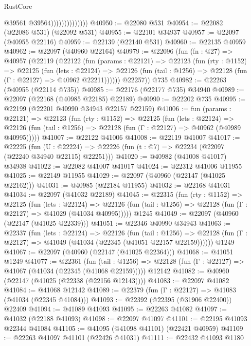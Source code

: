 \begin{lexlean}{RustCore}
\begin{coremodule}
                                @39561
                                @39564))))))))))))))
@40950 := @22080 @531
@40954 := @22082 (@22086 @531) (@22092 @531)
@40955 := @22101 @34937
@40957 := @22097 (@40955 @22116)
@40959 := @22139 (@22140 @531)
@40960 := @22135 @40959
@40962 := @22097 (@40960 @22164)
@40979 := @22096
    (fun (fn : @27) =>
    @40957
      (@22119
        (@22122
          (fun (params : @22121) =>
          @22123
            (fun (rty : @1152) =>
            @22125
              (fun (lets : @22124) =>
              @22126 (fun (tail : @1256) => @22128 (fun (Γ : @22127) => @40962 @22211))))))
        @22257))
    @735
@40982 := @22263 (@40955 (@22114 @735))
@40985 := @22176 (@22177 @735) @34940
@40989 := @22097 (@22168 (@40985 @22185) @22189)
@40990 := @22202 @735
@40995 := @22199 (@22201 @40990 @34943 @22157 @22159)
@41006 := fun (params : @22121) =>
  @22123
    (fun (rty : @1152) =>
    @22125
      (fun (lets : @22124) =>
      @22126 (fun (tail : @1256) => @22128 (fun (Γ : @22127) => @40962 (@40989 @40995)))))
@41007 := @22122 @41006
@41008 := @22119 @41007
@41017 := @22225
    (fun (U : @22224) => @22226 (fun (t : @7) => @22234 (@22097 (@22240 @34940 @22115) @22251)))
@41020 := @40982 (@41008 @41017) @34938
@41022 := @22082 @41007 @41017
@41024 := @22312 @41006 @11955
@41025 := @22149 @11955
@41029 := @22097 (@40960 (@22147 (@41025 @22162)))
@41031 := @40985 (@22184 @11955)
@41032 := @22168 @41031
@41034 := @22097 (@41032 @22189)
@41045 := @22315
    (fun (rty : @1152) =>
    @22125
      (fun (lets : @22124) =>
      @22126 (fun (tail : @1256) => @22128 (fun (Γ : @22127) => @41029 (@41034 @40995)))))
    @1245
@41049 := @22097 (@40960 (@22147 (@41025 @22339)))
@41051 := @22346 @40990 @34943
@41063 := @22337
    (fun (lets : @22124) =>
    @22126
      (fun (tail : @1256) =>
      @22128 (fun (Γ : @22127) => @41049 (@41034 (@22345 (@41051 @22157 @22159))))))
    @1249
@41067 := @22097 (@40960 (@22147 (@41025 @22364)))
@41068 := @41051 @1249
@41077 := @22361
    (fun (tail : @1256) => @22128 (fun (Γ : @22127) => @41067 (@41034 (@22345 (@41068 @22159)))))
    @12142
@41082 := @40960 (@22147 (@41025 (@22338 (@22156 @12143))))
@41083 := @22097 @41082
@41084 := @41068 @12142
@41089 := @22379 (fun (Γ : @22127) => @41083 (@41034 (@22345 @41084)))
@41093 := @22392 (@22395 (@31906 @22400)) @22409
@41094 := @41089 @41093
@41095 := @22263 @41082
@41097 := @41032 (@22188 @41093)
@41098 := @22097 @41097
@41101 := @22195 @41093 @22344 @41084
@41105 := @41095 (@41098 @41101) (@22421 @40959)
@41109 := @22263 @41097 @41101 (@22426 @41031)
@41111 := @22432 @41093 @1180

\end{coremodule}
\end{lexlean}
